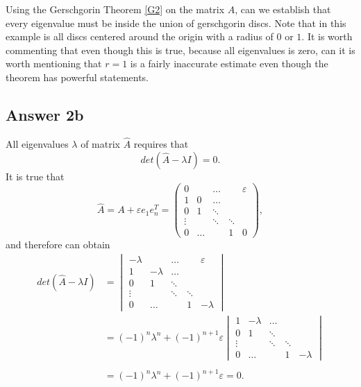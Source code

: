 \documentclass{article}
\theoremstyle{remark}
\begin{document}
Using the Gerschgorin Theorem \ref{G2} on the matrix $A$, can we establish that every eigenvalue must be inside the union of gerschgorin discs. Note that in this example is all discs centered around the origin with a radius of $0$ or $1$. It is worth commenting that even though this is true, because all eigenvalues is zero, can it is worth mentioning that $r=1$ is a fairly inaccurate estimate even though the theorem has powerful statements.

    \subsection{Answer 2b}%
\label{sub:answer_b_}


    All eigenvalues $\lambda $ of matrix $\hat{A}$ requires that \[
    det\left( \hat{A} - \lambda I \right) = 0.
    \]  
    It is true that
    \[
    \hat{A} = A + \varepsilon e_{1}e_{n}^{T} = \begin{pmatrix}
    0    &   &  \ldots           &    &  \varepsilon  \\
    1  & 0  &  \ldots \\
    0  &  1  & \ddots  \\
    \vdots   &   &  \ddots   &  \ddots   & \\
     0  &  \ldots  &   &  1  & 0
    \end{pmatrix}, 
    \] 
    and therefore can obtain
     \[
      \begin{split}
    det \left(  \hat{A} - \lambda I \right)  & = \begin{vmatrix}
    -\lambda     &   &  \ldots           &    &  \varepsilon  \\
    1  & -\lambda   &  \ldots \\
    0  &  1  & \ddots  \\
    \vdots   &   &  \ddots   &  \ddots   & \\
     0  &  \ldots  &   &  1  & -\lambda 
    \end{vmatrix}  \\
    &=  \left( -1 \right)^{n} \lambda ^{n}  + \left( -1 \right)^{n+1}\varepsilon 
     \begin{vmatrix}
    1  & -\lambda   &  \ldots \\
    0  &  1  & \ddots  \\
    \vdots   &   &  \ddots   &  \ddots   & \\
     0  &  \ldots  &   &  1  & -\lambda 
    \end{vmatrix}  \\
     \\
     &=  \left( -1 \right)^{n} \lambda ^{n} + \left( -1 \right)^{n+1}\varepsilon  = 0 .  \\
      \end{split} 
    \] 
\end{document}
